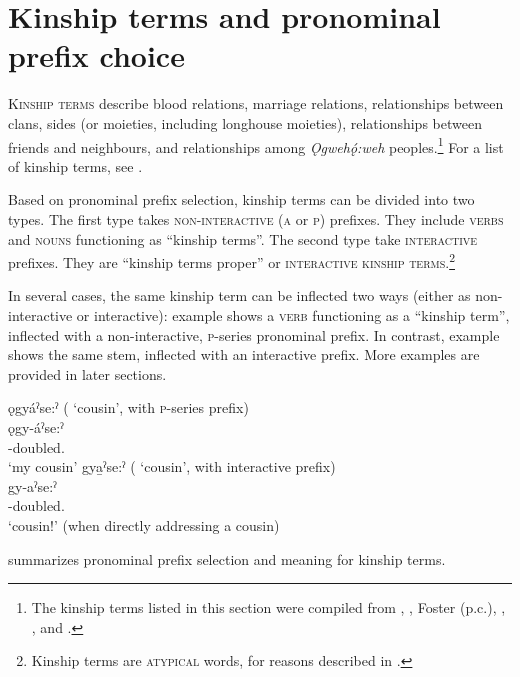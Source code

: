 \chapter{Kinship terms and pronominal prefix choice} \label{ch:Kinship terms and pronominal prefix choice}
\textsc{Kinship terms} describe blood relations, marriage relations, relationships between clans, sides (or moieties, including longhouse moieties), relationships between friends and neighbours, and relationships among \textit{Ǫgwehǫ́:weh} peoples.\footnote{The kinship terms listed in this section were compiled from \citet{deer_cayuga_2015}, \citet{foster_course_1993}, Foster (p.c.), \citet{froman_english-cayugacayuga-english_2002}, \citet{mithun_watewayestanih_1984}, and \citet{sasse_far_1998}.} For a list of kinship terms, see .


Based on pronominal prefix selection, kinship terms can be divided into two types. The first type takes \textsc{non-interactive} (\textsc{a} or \textsc{p}) prefixes. They include \textsc{verbs} and \textsc{nouns} functioning as “kinship terms”. The second type take \textsc{interactive} prefixes. They are “kinship terms proper” or \textsc{interactive kinship terms}.\footnote{Kinship terms are \textsc{atypical} words, for reasons described in .} 


In several cases, the same kinship term can be inflected two ways (either as non-interactive or interactive): example  shows a \textsc{verb} functioning as a “kinship term”, inflected with a non-interactive, \textsc{p}-series pronominal prefix. In contrast, example  shows the same stem, inflected with an interactive prefix. More examples are provided in later sections.
 
\ea\label{ex:twotypes} 
\ea\label{ex:twotypesa} ǫgyáˀse:ˀ ( ‘cousin’, with \textsc{p}-series prefix)\\
\gll ǫgy-áˀse:ˀ\\
 -doubled.{\stative} \\
\glt `my cousin'
\ex gya̱ˀse:ˀ ( ‘cousin’, with interactive prefix)\\\label{ex:twotypesb} 
\gll gy-aˀse:ˀ\\
-doubled.{\stative} \\
\glt ‘cousin!’ (when directly addressing a cousin)  
\z
\z

 summarizes pronominal prefix selection and meaning for kinship terms.

